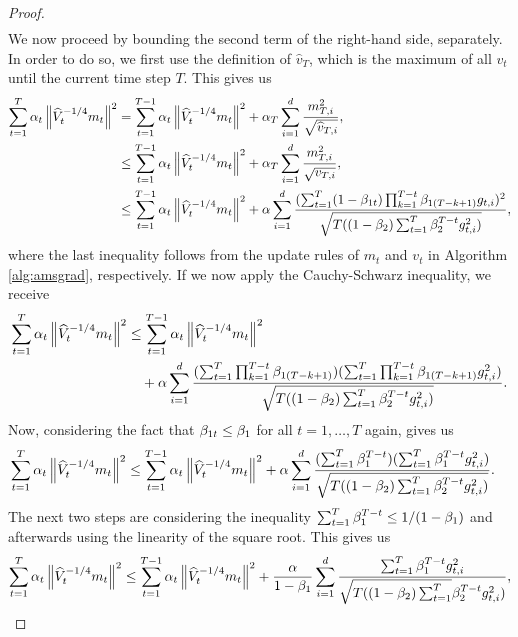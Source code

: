\begin{proof}
\begin{align}
\end{align}
We now proceed by bounding the second term of the right-hand side, separately.\\
In order to do so, we first use the definition of $\hat{v}_T$, which is the maximum of all $v_t$ until the current time step $T$. This gives us
\begin{align*}
\sum_{t=1}^T \alpha_t \left\| \widehat{V}_t^{-1/4} m_t \right\|^2 &= \sum_{t=1}^{T-1} \alpha_t \left\| \widehat{V}_t^{-1/4} m_t \right\|^2 + \alpha_T \sum_{i=1}^{d} \frac{m_{T,i}^2}{\sqrt{\widehat{v}_{T,i}}},\\
&\leq \sum_{t=1}^{T-1} \alpha_t \left\| \widehat{V}_t^{-1/4} m_t \right\|^2 + \alpha_T \sum_{i=1}^{d} \frac{m_{T,i}^2}{\sqrt{v_{T,i}}},\\
&\leq \sum_{t=1}^{T-1} \alpha_t \left\| \widehat{V}_t^{-1/4} m_t \right\|^2 + \alpha \sum_{i=1}^{d} \frac{(\sum_{t=1}^T(1- \beta_{1t}) \prod_{k=1}^{T-t} \beta_{1(T-k+1)} g_{t,i})^2 }{\sqrt{T((1-\beta_2) \sum_{t=1}^T \beta_2^{T-t}g_{t,i}^2)}},
\end{align*}
where the last inequality follows from the update rules of $m_t$ and $v_t$ in Algorithm \ref{alg:amsgrad}, respectively. If we now apply the Cauchy-Schwarz inequality, we receive
\begin{align*}
\sum_{t=1}^T \alpha_t \left\| \widehat{V}_t^{-1/4} m_t \right\|^2 &\leq \sum_{t=1}^{T-1} \alpha_t \left\| \widehat{V}_t^{-1/4} m_t \right\|^2\\
&\quad + \alpha \sum_{i=1}^{d} \frac{(\sum_{t=1}^T\prod_{k=1}^{T-t}\beta_{1(T-k+1)}) (\sum_{t=1}^T\prod_{k=1}^{T-t} \beta_{1(T-k+1)} g_{t,i}^2 )}{\sqrt{T((1-\beta_2) \sum_{t=1}^T \beta_2^{T-t}g_{t,i}^2)}}.
\end{align*}
Now, considering the fact that $\beta_{1t}\leq \beta_1$ for all $t=1,\ldots,T$ again, gives us
\begin{align*}
\sum_{t=1}^T \alpha_t \left\| \widehat{V}_t^{-1/4} m_t \right\|^2 &\leq \sum_{t=1}^{T-1} \alpha_t \left\| \widehat{V}_t^{-1/4} m_t \right\|^2 + \alpha \sum_{i=1}^{d} \frac{(\sum_{t=1}^T\beta_1^{T-t}) (\sum_{t=1}^T\beta_1^{T-t}g_{t,i}^2 )}{\sqrt{T((1-\beta_2) \sum_{t=1}^T \beta_2^{T-t}g_{t,i}^2)}}.
\end{align*}
The next two steps are considering the inequality $\sum_{t=1}^T \beta_1^{T-t} \leq 1/(1-\beta_1)$ and afterwards using the linearity of the square root. This gives us
\begin{align*}
\sum_{t=1}^T \a_t \left\| \hat{V}_t^{-1/4} m_t \right\|^2 &\leq \sum_{t=1}^{T-1} \a_t \left\| \hat{V}_t^{-1/4} m_t \right\|^2 + \frac{\a}{1-\b_1} \sum_{i=1}^{d} \frac{\sum_{t=1}^T\b_1^{T-t}g_{t,i}^2}{\sqrt{T((1-\b_2) \sum_{t=1}^T} \b_2^{T-t}g_{t,i}^2)},\\

\end{align*}
\end{proof}
